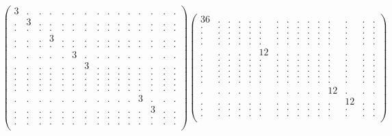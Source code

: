\documentclass[12pt,a4paper]{amsart}
\begin{document}
\begin{align*}
\left(\begin{array}{rrrrrrrrrrrrrrr}%
3&.&.&.&.&.&.&.&.&.&.&.&.&.&.\\%
.&3&.&.&.&.&.&.&.&.&.&.&.&.&.\\%
.&.&.&.&.&.&.&.&.&.&.&.&.&.&.\\%
.&.&.&3&.&.&.&.&.&.&.&.&.&.&.\\%
.&.&.&.&.&.&.&.&.&.&.&.&.&.&.\\%
.&.&.&.&.&3&.&.&.&.&.&.&.&.&.\\%
.&.&.&.&.&.&3&.&.&.&.&.&.&.&.\\%
.&.&.&.&.&.&.&.&.&.&.&.&.&.&.\\%
.&.&.&.&.&.&.&.&.&.&.&.&.&.&.\\%
.&.&.&.&.&.&.&.&.&.&.&.&.&.&.\\%
.&.&.&.&.&.&.&.&.&.&.&.&.&.&.\\%
.&.&.&.&.&.&.&.&.&.&.&3&.&.&.\\%
.&.&.&.&.&.&.&.&.&.&.&.&3&.&.\\%
.&.&.&.&.&.&.&.&.&.&.&.&.&.&.\\%
.&.&.&.&.&.&.&.&.&.&.&.&.&.&.\\%
\end{array}\right)%
\left(\begin{array}{rrrrrrrrrrrrrrr}%
36&.&.&.&.&.&.&.&.&.&.&.&.&.&.\\%
.&.&.&.&.&.&.&.&.&.&.&.&.&.&.\\%
.&.&.&.&.&.&.&.&.&.&.&.&.&.&.\\%
.&.&.&.&.&.&.&.&.&.&.&.&.&.&.\\%
.&.&.&.&.&.&.&.&.&.&.&.&.&.&.\\%
.&.&.&.&.&12&.&.&.&.&.&.&.&.&.\\%
.&.&.&.&.&.&.&.&.&.&.&.&.&.&.\\%
.&.&.&.&.&.&.&.&.&.&.&.&.&.&.\\%
.&.&.&.&.&.&.&.&.&.&.&.&.&.&.\\%
.&.&.&.&.&.&.&.&.&.&.&.&.&.&.\\%
.&.&.&.&.&.&.&.&.&.&.&.&.&.&.\\%
.&.&.&.&.&.&.&.&.&.&.&12&.&.&.\\%
.&.&.&.&.&.&.&.&.&.&.&.&12&.&.\\%
.&.&.&.&.&.&.&.&.&.&.&.&.&.&.\\%
.&.&.&.&.&.&.&.&.&.&.&.&.&.&.\\%
\end{array}\right)%
\end{align*}
\end{document}
